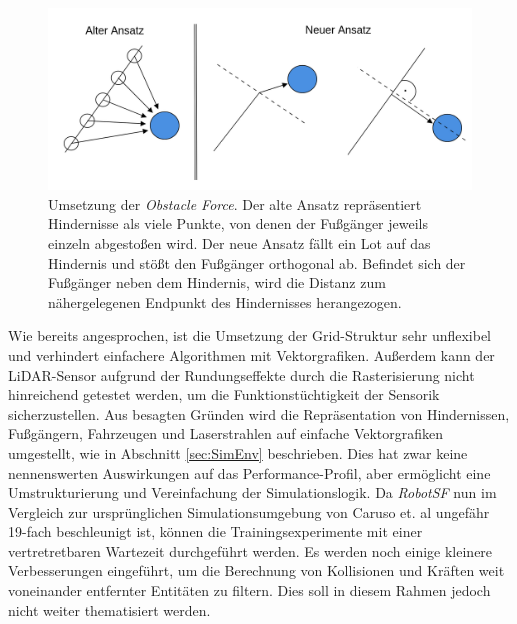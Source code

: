 \begin{figure}[h]
  \centering
  \includegraphics[width = 1.0\textwidth]{imgs/obstacle_force}
  \caption{Umsetzung der \emph{Obstacle Force}. Der alte Ansatz repräsentiert Hindernisse
  als viele Punkte, von denen der Fußgänger jeweils einzeln abgestoßen wird.
  Der neue Ansatz fällt ein Lot auf das Hindernis und stößt den Fußgänger orthogonal ab.
  Befindet sich der Fußgänger neben dem Hindernis, wird die Distanz zum nähergelegenen
  Endpunkt des Hindernisses herangezogen.}
  \label{fig:ObstacleForceOpt}
\end{figure}

Wie bereits angesprochen, ist die Umsetzung der Grid-Struktur sehr unflexibel und verhindert
einfachere Algorithmen mit Vektorgrafiken. Außerdem kann der LiDAR-Sensor aufgrund der
Rundungseffekte durch die Rasterisierung nicht hinreichend getestet werden, um die
Funktionstüchtigkeit der Sensorik sicherzustellen. Aus besagten Gründen wird die Repräsentation
von Hindernissen, Fußgängern, Fahrzeugen und Laserstrahlen auf einfache Vektorgrafiken umgestellt,
wie in Abschnitt \ref{sec:SimEnv} beschrieben. Dies hat zwar keine nennenswerten Auswirkungen auf das
Performance-Profil, aber ermöglicht eine Umstrukturierung und Vereinfachung der Simulationslogik.
Da \emph{RobotSF} nun im Vergleich zur ursprünglichen Simulationsumgebung von Caruso et. al
ungefähr 19-fach beschleunigt ist, können die Trainingsexperimente mit einer vertretretbaren
Wartezeit durchgeführt werden. Es werden noch einige kleinere Verbesserungen eingeführt,
um die Berechnung von Kollisionen und Kräften weit voneinander entfernter Entitäten
zu filtern. Dies soll in diesem Rahmen jedoch nicht weiter thematisiert werden.

